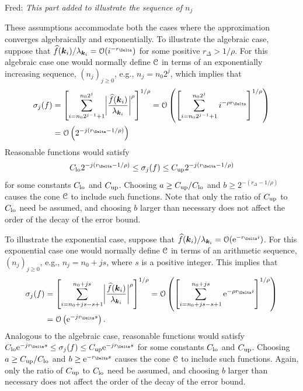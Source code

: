 \documentclass[USenglish]{article}
\theoremstyle{dgthm}
\theoremstyle{dgthm}
\theoremstyle{dgthm}
\theoremstyle{dgthm}
\theoremstyle{dgdef}
\theoremstyle{definition}
\newcommand{\hf}{\widehat{f}}
\newcommand{\lo}{\textup{lo}}
\newcommand{\up}{\textup{up}}
\newcommand{\E}{\textup{e}}
\newcommand{\biggabs}[1]{\ensuremath{\biggl \lvert #1 \biggr \rvert}}
\newcommand{\FredNote}[1]{{\color{blue}Fred: #1}}
\begin{document}
\FredNote{\emph{This part added to illustrate the sequence of $n_j$}

These assumptions accommodate both the cases where the approximation converges algebraically and exponentially.  To illustrate the algebraic case, suppose that $\hf(\bsk_i)/\lambda_{\bsk_i} = \calO(i^{-r_\Delta})$ for some positive $r_\Delta > 1/\rho$.  For this algebraic case one would normally define ${\mathcal{C}}$ in terms of an exponentially increasing sequence, $(n_j)_{j\ge 0}$, e.g., $n_j = n_0 2^j$, which implies that 
\begin{align*}
    \sigma_j(f) &= \left[ \sum_{i=n_0 2^{j-1} + 1}^{n_0 2^j} \biggabs{\frac{\hf(\bsk_i)}{\lambda_{\bsk_i}}}^\rho \right]^{1/\rho}
    = \calO \left( \left [ \sum_{i=n_0 2^{j-1} + 1}^{n_0 2^j} i^{-\rho r_\Delta} \right]^{1/\rho} \right) \\
    & = \calO \left(  2^{-j(r_\Delta-1/\rho)} \right)
\end{align*}
Reasonable functions would satisfy 
\begin{equation*}
    C_{\lo} 2^{-j(r_\Delta-1/\rho)} \le \sigma_j(f) \le C_{\up} 2^{-j(r_\Delta-1/\rho)} 
\end{equation*}
for some constants $C_{\lo}$ and $C_{\up}$.  Choosing $a \ge C_{\up}/C_{\lo} $  and $b \ge  2^{-(r_\Delta-1/\rho)}$ causes the cone ${\mathcal{C}}$ to include such functions.  Note that only the ratio of $C_{\up}$ to $C_{\lo}$ need be assumed, and choosing $b$ larger than necessary does not affect the order of the decay of the error bound. 

To illustrate the exponential case, suppose that $\hf(\bsk_i)/\lambda_{\bsk_i} = \calO(\E^{-r_\Delta i})$.  For this exponential case one would normally define ${\mathcal{C}}$ in terms of an arithmetic sequence, $(n_j)_{j\ge 0}$, e.g., $n_j = n_0 + j s$, where $s$ is a positive integer.  This implies that 
\begin{align*}
    \sigma_j(f) &= \left[ \sum_{i=n_0 + j s -s + 1}^{n_0 + j s} \biggabs{\frac{\hf(\bsk_i)}{\lambda_{\bsk_i}}}^\rho \right]^{1/\rho}
    = \calO \left( \left [ \sum_{i=n_0 + j s -s + 1}^{n_0 + j s} \E^{- \rho r_\Delta i} \right]^{1/\rho} \right) \\
    & = \calO \left(  \E^{-j r_{\Delta} s} \right).
\end{align*}
Analogous to the algebraic case, reasonable functions would satisfy 
    $C_{\lo} \E^{-j r_{\Delta} s} \le \sigma_j(f) \le C_{\up} \E^{-j r_{\Delta} s}$
for some constants $C_{\lo}$ and $C_{\up}$.  Choosing $a \ge C_{\up}/C_{\lo} $  and $b \ge \E^{- r_{\Delta} s}$ causes the cone ${\mathcal{C}}$ to include such functions.  Again, only the ratio of $C_{\up}$ to $C_{\lo}$ need be assumed, and choosing $b$ larger than necessary does not affect the order of the decay of the error bound.
}
\end{document}
